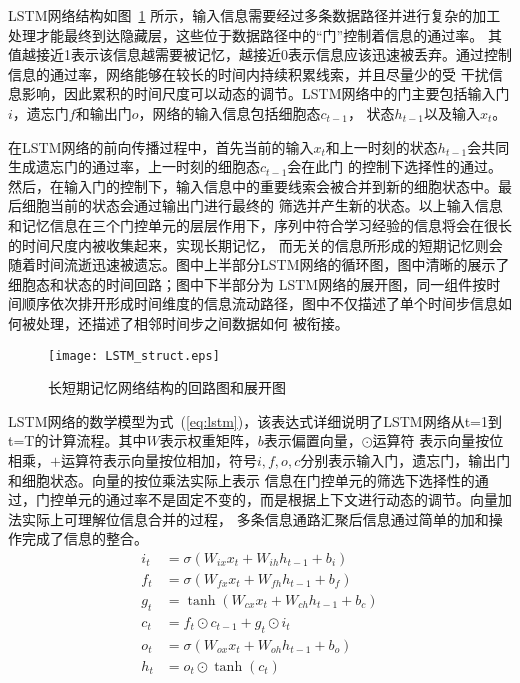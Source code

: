 LSTM网络结构如图~\ref{fig:lstm} 所示，输入信息需要经过多条数据路径并进行复杂的加工处理才能最终到达隐藏层，这些位于数据路径中的“门”控制着信息的通过率。
其值越接近1表示该信息越需要被记忆，越接近0表示信息应该迅速被丢弃。通过控制信息的通过率，网络能够在较长的时间内持续积累线索，并且尽量少的受
干扰信息影响，因此累积的时间尺度可以动态的调节。LSTM网络中的门主要包括输入门\(i\)，遗忘门\(f\)和输出门\(o\)，网络的输入信息包括细胞态\(c_{t-1}\)，
状态\(h_{t-1}\)以及输入\(x_t\)。

在LSTM网络的前向传播过程中，首先当前的输入\(x_t\)和上一时刻的状态\(h_{t-1}\)会共同生成遗忘门的通过率，上一时刻的细胞态\(c_{t-1}\)会在此门
的控制下选择性的通过。然后，在输入门的控制下，输入信息中的重要线索会被合并到新的细胞状态中。最后细胞当前的状态会通过输出门进行最终的
筛选并产生新的状态。以上输入信息和记忆信息在三个门控单元的层层作用下，序列中符合学习经验的信息将会在很长的时间尺度内被收集起来，实现长期记忆，
而无关的信息所形成的短期记忆则会随着时间流逝迅速被遗忘。图中上半部分LSTM网络的循环图，图中清晰的展示了细胞态和状态的时间回路；图中下半部分为
LSTM网络的展开图，同一组件按时间顺序依次排开形成时间维度的信息流动路径，图中不仅描述了单个时间步信息如何被处理，还描述了相邻时间步之间数据如何
被衔接。

\begin{figure}
	\centering
	\texttt{[image: LSTM\_struct.eps]}
	\caption{长短期记忆网络结构的回路图和展开图}
	\label{fig:lstm}
\end{figure}

LSTM网络的数学模型为式~(\ref{eq:lstm})，该表达式详细说明了LSTM网络从t=1到t=T的计算流程。其中\(W\)表示权重矩阵，\(b\)表示偏置向量，\(\odot\)运算符
表示向量按位相乘，\(+\)运算符表示向量按位相加，符号\(i,f,o,c\)分别表示输入门，遗忘门，输出门和细胞状态。向量的按位乘法实际上表示
信息在门控单元的筛选下选择性的通过，门控单元的通过率不是固定不变的，而是根据上下文进行动态的调节。向量加法实际上可理解位信息合并的过程，
多条信息通路汇聚后信息通过简单的加和操作完成了信息的整合。
\begin{equation}\label{eq:lstm}
	\begin{split}
		i_t &= \sigma(W_{ix} x_t + W_{ih} h_{t-1} + b_i)	\\
		f_t &= \sigma(W_{fx} x_t + W_{fh} h_{t-1} + b_f)	\\
		g_t &= \tanh(W_{cx} x_t + W_{ch} h_{t-1} + b_c)					\\
		c_t &= f_t \odot c_{t-1} + g_t \odot i_t							\\	
		o_t &= \sigma(W_{ox} x_{t} + W_{oh} h_{t-1} + b_o)	\\
		h_t &= o_t \odot \tanh(c_{t})											\\												
	\end{split}
\end{equation}


